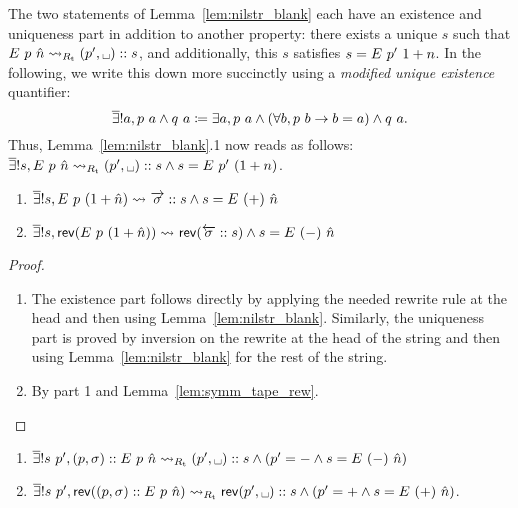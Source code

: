 \newcommand{\mexists}{\overline{\exists}!}
The two statements of Lemma~\ref{lem:nilstr_blank} each have an existence and uniqueness part in addition to another property: there exists a unique $s$ such that $\nilstr{p}{\hat{n}} \strent{\Rtape} (p', \blank) :: s$, and additionally, this $s$ satisfies $s = E~p'~1 +{n}$. In the following, we write this down more succinctly using a \emph{modified unique existence} quantifier:
\[\mexists a, p~a \land q~a \defeq \exists a, p~a \land (\forall b, p~b \rightarrow b = a) \land q~a. \]
Thus, Lemma~\ref{lem:nilstr_blank}.1 now reads as follows: $\mexists s, \nilstr{p}{\hat{n}} \strent{\Rtape} (p', \blank) :: s \land s = \nilstr{p'}{(\natS{n})}$. 

\begin{lemma}\label{lem:nilstr_add}\leavevmode
  \begin{enumerate}
    \item $\mexists s, \nilstr{p}{(\natS{\hat{n}})} \strent{} \polpos{\sigma} :: s \land s = \nilstr{(+)}{\hat{n}}$
    \item $\mexists s, \rev{(\nilstr{p}{(\natS{\hat{n}})})} \strent{} \rev{(\polneg{\sigma} :: s)} \land s = \nilstr{(-)}{\hat{n}}$
  \end{enumerate}
\end{lemma}
\begin{proof}
  \begin{enumerate}
    \item The existence part follows directly by applying the needed rewrite rule at the head and then using Lemma~\ref{lem:nilstr_blank}. Similarly, the uniqueness part is proved by inversion on the rewrite at the head of the string and then using Lemma~\ref{lem:nilstr_blank} for the rest of the string.
    \item By part 1 and Lemma~\ref{lem:symm_tape_rew}. 
  \end{enumerate}
\end{proof}

\begin{lemma}\label{lem:nilstr_rem}\leavevmode
  \begin{enumerate}
    \item $\mexists s~p', (p, \sigma) :: \nilstr{p}{\hat{n}} \strent{\Rtape} (p', \blank) :: s \land (p' = - \land s = \nilstr{(-)}{\hat{n}})$
    \item $\mexists s~p', \rev{((p, \sigma) :: \nilstr{p}{\hat{n}})} \strent{\Rtape} \rev{(p', \blank):: s} \land (p' = + \land s = \nilstr{(+)}{\hat{n}})$. 
  \end{enumerate}
\end{lemma}

